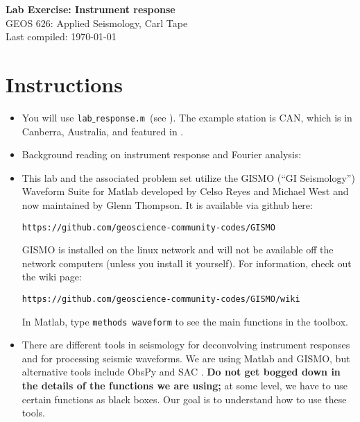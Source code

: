 \documentclass[11pt,titlepage,fleqn]{article}
\newcommand{\tfile}{{\tt lab$\_$response.m}}
\begin{document}

\begin{spacing}{1.2}
\centering
{\large \bf Lab Exercise: Instrument response} \\
GEOS 626: Applied Seismology, Carl Tape \\
Last compiled: \today
\end{spacing}


\section{Instructions}

\begin{itemize}

\item You will use \tfile\ (see ). The example station is CAN, which is in Canberra, Australia, and featured in \citet[][Figure~1]{Park2005}.


\item Background reading on instrument response and Fourier analysis: \\ \citet[][Ch.~6]{SteinWysession}


\item This lab and the associated problem set utilize the GISMO (``GI Seismology'') Waveform Suite for Matlab developed by Celso Reyes and Michael West \citep{ReyesWest2011} and now maintained by Glenn Thompson. It is available via github here:

\verb+https://github.com/geoscience-community-codes/GISMO+

GISMO is installed on the linux network and will not be available off the network computers (unless you install it yourself). For information, check out the wiki page:

\verb+https://github.com/geoscience-community-codes/GISMO/wiki+

In Matlab, type \verb+methods waveform+ to see the main functions in the toolbox.


\item There are different tools in seismology for deconvolving instrument responses and for processing seismic waveforms. We are using Matlab and GISMO, but alternative tools include ObsPy \citep{obspy2010} and SAC \citep{SAC}. {\bf Do not get bogged down in the details of the functions we are using;} at some level, we have to use certain functions as black boxes. Our goal is to understand how to use these tools.


\end{itemize}
\end{document}
